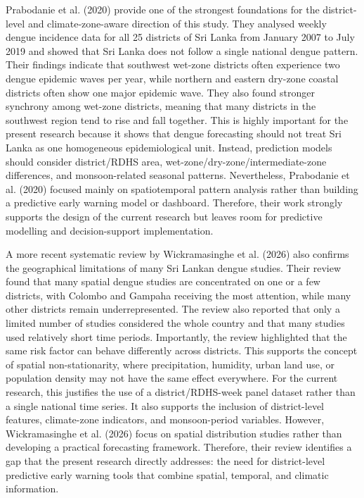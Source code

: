 \documentclass[12pt,a4paper]{article}
\begin{document}
Prabodanie et al. (2020) provide one of the strongest foundations for the district-level and climate-zone-aware direction of this study. They analysed weekly dengue incidence data for all 25 districts of Sri Lanka from January 2007 to July 2019 and showed that Sri Lanka does not follow a single national dengue pattern. Their findings indicate that southwest wet-zone districts often experience two dengue epidemic waves per year, while northern and eastern dry-zone coastal districts often show one major epidemic wave. They also found stronger synchrony among wet-zone districts, meaning that many districts in the southwest region tend to rise and fall together. This is highly important for the present research because it shows that dengue forecasting should not treat Sri Lanka as one homogeneous epidemiological unit. Instead, prediction models should consider district/RDHS area, wet-zone/dry-zone/intermediate-zone differences, and monsoon-related seasonal patterns. Nevertheless, Prabodanie et al. (2020) focused mainly on spatiotemporal pattern analysis rather than building a predictive early warning model or dashboard. Therefore, their work strongly supports the design of the current research but leaves room for predictive modelling and decision-support implementation.

A more recent systematic review by Wickramasinghe et al. (2026) also confirms the geographical limitations of many Sri Lankan dengue studies. Their review found that many spatial dengue studies are concentrated on one or a few districts, with Colombo and Gampaha receiving the most attention, while many other districts remain underrepresented. The review also reported that only a limited number of studies considered the whole country and that many studies used relatively short time periods. Importantly, the review highlighted that the same risk factor can behave differently across districts. This supports the concept of spatial non-stationarity, where precipitation, humidity, urban land use, or population density may not have the same effect everywhere. For the current research, this justifies the use of a district/RDHS-week panel dataset rather than a single national time series. It also supports the inclusion of district-level features, climate-zone indicators, and monsoon-period variables. However, Wickramasinghe et al. (2026) focus on spatial distribution studies rather than developing a practical forecasting framework. Therefore, their review identifies a gap that the present research directly addresses: the need for district-level predictive early warning tools that combine spatial, temporal, and climatic information.
\end{document}
